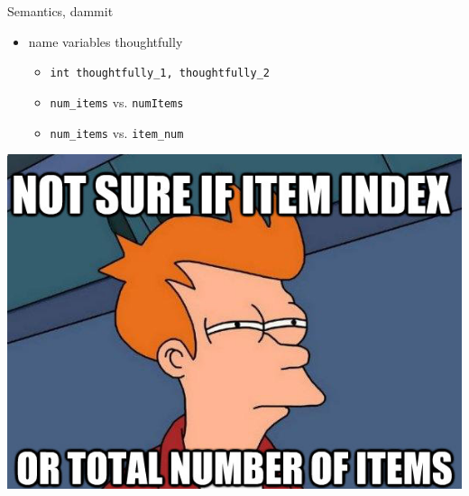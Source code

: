\documentclass{beamer}
\begin{document}
\begin{frame}{Semantics, dammit}
  \begin{itemize}
    \pause
    \item name variables thoughtfully
    \pause
    \begin{itemize}
      \item \texttt{int thoughtfully\_1, thoughtfully\_2}
      \pause
      \item \texttt{num\_items} vs. \texttt{numItems}
      \pause
      \item \texttt{num\_items} vs. \texttt{item\_num}
    \end{itemize}
    \pause
  \end{itemize}
  \begin{center}
    \includegraphics[scale=0.3]{fry}
  \end{center}
\end{frame}
\end{document}
